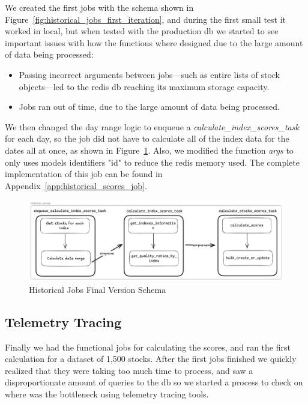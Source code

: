 \documentclass[11pt,english,a4paper,hidelinks]{book}
\begin{document}
\noindent We created the first jobs with the schema shown in Figure~\ref{fig:historical_jobs_first_iteration}, and during the first small test it worked in local, but when tested with the production \acrshort{db} we started to see important issues with how the functions where designed due to the large amount of data being processed:
\begin{itemize}
    \item Passing incorrect arguments between jobs—such as entire lists of stock objects—led to the \acrshort{redis} \acrshort{db} reaching its maximum storage capacity.
    \item Jobs ran out of time, due to the large amount of data being processed.
\end{itemize}

\noindent We then changed the day range logic to enqueue a \textit{calculate\_index\_scores\_task} for each day, so the job did not have to calculate all of the index data for the dates all at once, as shown in Figure~\ref{fig:historical_jobs_final_version}. Also, we modified the function \textit{args} to only uses models identifiers "id" to reduce the \acrshort{redis} memory used. The complete implementation of this job can be found in Appendix~\ref{app:historical_scores_job}.

\begin{figure}[H]
    \centering
    \includegraphics[width=1\textwidth]{images/tweenvest/Historical Jobs Final Version.png}
    \caption{Historical Jobs Final Version Schema}
    \label{fig:historical_jobs_final_version}
\end{figure}



\subsection{Telemetry Tracing}
Finally we had the functional jobs for calculating the scores, and ran the first calculation for a dataset of 1,500 stocks. After the first jobs finished we quickly realized that they were taking too much time to process, and saw a disproportionate amount of queries to the \acrshort{db} so we started a process to check on where was the bottleneck using telemetry tracing tools.
\end{document}
